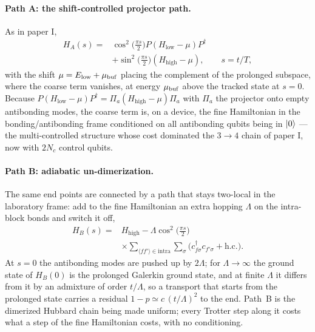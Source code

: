 \documentclass[a4paper,11pt,noarxiv]{quantumarticle}
\newcommand{\Hlow}{H_{\mathrm{low}}}
\newcommand{\Hhigh}{H_{\mathrm{high}}}
\begin{document}
\paragraph{Path A: the shift-controlled projector path.}
As in paper I,
\begin{align}
  H_A(s)={}&\cos^2\!\big(\tfrac{\pi s}{2}\big)P(\Hlow-\mu)P^\dagger\nonumber\\
        &+\sin^2\!\big(\tfrac{\pi s}{2}\big)(\Hhigh-\mu),\qquad s=t/T,
  \label{eq:pathA}
\end{align}
with the shift $\mu=E_{\rm low}+\mu_{\rm buf}$ placing the complement of the
prolonged subspace, where the coarse term vanishes, at energy $\mu_{\rm buf}$
above the tracked state at $s=0$.  Because
$P(\Hlow-\mu)P^\dagger=\Pi_a(\Hhigh-\mu)\Pi_a$ with $\Pi_a$ the projector
onto empty antibonding modes, the coarse term is, on a device, the fine
Hamiltonian in the bonding/antibonding frame conditioned on all antibonding
qubits being in $\ket0$ --- the multi-controlled structure whose cost
dominated the $3\to4$ chain of paper I, now with $2N_c$ control qubits.

\paragraph{Path B: adiabatic un-dimerization.}
The same end points are connected by a path that stays two-local in the
laboratory frame: add to the fine Hamiltonian an extra hopping $\Lambda$ on
the intra-block bonds and switch it off,
\begin{align}
  H_B(s)={}&\Hhigh-\Lambda\cos^2\!\big(\tfrac{\pi s}{2}\big)\nonumber\\
  &\times\sum_{\langle ff'\rangle\in\mathrm{intra}}\sum_\sigma
  \big(c^\dagger_{f\sigma}c_{f'\sigma}+\mathrm{h.c.}\big).
  \label{eq:pathB}
\end{align}
At $s=0$ the antibonding modes are pushed up by $2\Lambda$; for
$\Lambda\to\infty$ the ground state of $H_B(0)$ is the prolonged Galerkin
ground state, and at finite $\Lambda$ it differs from it by an admixture of
order $t/\Lambda$, so a transport that starts from the prolonged state
carries a residual $1-p\simeq c\,(t/\Lambda)^2$ to the end.  Path~B is the
dimerized Hubbard chain being made uniform; every Trotter step along it
costs what a step of the fine Hamiltonian costs, with no conditioning.
\end{document}
